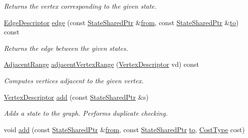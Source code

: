 \begin{DoxyCompactItemize}
\begin{DoxyCompactList}\small\item\em Returns the vertex corresponding to the given state. \end{DoxyCompactList}\item 
\hyperlink{structslb_1_1core_1_1ui_1_1StateGraph_a7e894f002383b1687652a91549c3656d}{Edge\+Descriptor} \hyperlink{structslb_1_1core_1_1ui_1_1StateGraph_acd14b8c54233386514915dd9a590d2fa}{edge} (const \hyperlink{structslb_1_1core_1_1ui_1_1StateGraph_a367045176eaaf1580231bf5a4c35e2f8}{State\+Shared\+Ptr} \&\hyperlink{structslb_1_1core_1_1ui_1_1StateGraph_ab706be51cb6a847bcc7ec3eacb569abb}{from}, const \hyperlink{structslb_1_1core_1_1ui_1_1StateGraph_a367045176eaaf1580231bf5a4c35e2f8}{State\+Shared\+Ptr} \&\hyperlink{structslb_1_1core_1_1ui_1_1StateGraph_a96f73bac974845d5b2d039e88b23289f}{to}) const 
\begin{DoxyCompactList}\small\item\em Returns the edge between the given states. \end{DoxyCompactList}\item 
\hyperlink{structslb_1_1core_1_1ui_1_1StateGraph_a2ba22d3efc94008c1ad2ed7f338e2fa9}{Adjacent\+Range} \hyperlink{structslb_1_1core_1_1ui_1_1StateGraph_acc373676a821ded7cde60b99d8b83be7}{adjacent\+Vertex\+Range} (\hyperlink{structslb_1_1core_1_1ui_1_1StateGraph_ab2d88fce7d30dc6346910900212a7e6d}{Vertex\+Descriptor} vd) const 
\begin{DoxyCompactList}\small\item\em Computes vertices adjacent to the given vertex. \end{DoxyCompactList}\item 
\hyperlink{structslb_1_1core_1_1ui_1_1StateGraph_ab2d88fce7d30dc6346910900212a7e6d}{Vertex\+Descriptor} \hyperlink{structslb_1_1core_1_1ui_1_1StateGraph_ab4cabebae1f5f7000184d8941c4d5073}{add} (const \hyperlink{structslb_1_1core_1_1ui_1_1StateGraph_a367045176eaaf1580231bf5a4c35e2f8}{State\+Shared\+Ptr} \&s)
\begin{DoxyCompactList}\small\item\em Adds a state to the graph. Performs duplicate checking. \end{DoxyCompactList}\item 
void \hyperlink{structslb_1_1core_1_1ui_1_1StateGraph_a23b860c1a1b5d5aeb4220246594d5602}{add} (const \hyperlink{structslb_1_1core_1_1ui_1_1StateGraph_a367045176eaaf1580231bf5a4c35e2f8}{State\+Shared\+Ptr} \&\hyperlink{structslb_1_1core_1_1ui_1_1StateGraph_ab706be51cb6a847bcc7ec3eacb569abb}{from}, const \hyperlink{structslb_1_1core_1_1ui_1_1StateGraph_a367045176eaaf1580231bf5a4c35e2f8}{State\+Shared\+Ptr} \hyperlink{structslb_1_1core_1_1ui_1_1StateGraph_a96f73bac974845d5b2d039e88b23289f}{to}, \hyperlink{structslb_1_1core_1_1ui_1_1StateGraph_abd4aca3db1572710c32f035489deddef}{Cost\+Type} cost)

\end{DoxyCompactItemize}
